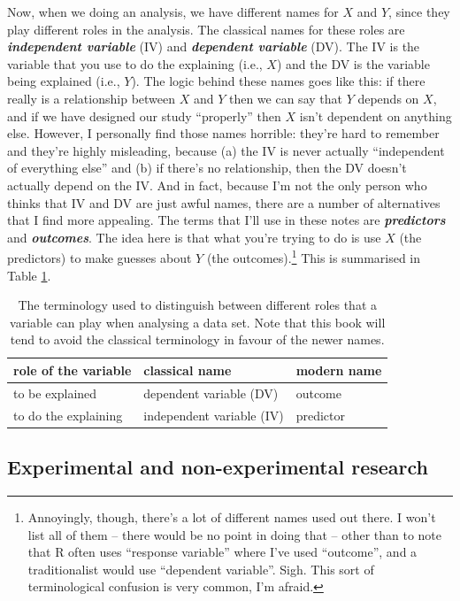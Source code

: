\documentclass[
]{book}
\begin{document}
Now, when we doing an analysis, we have different names for \(X\) and \(Y\), since they play different roles in the analysis. The classical names for these roles are \textbf{\emph{independent variable}} (IV) and \textbf{\emph{dependent variable}} (DV). The IV is the variable that you use to do the explaining (i.e., \(X\)) and the DV is the variable being explained (i.e., \(Y\)). The logic behind these names goes like this: if there really is a relationship between \(X\) and \(Y\) then we can say that \(Y\) depends on \(X\), and if we have designed our study ``properly'' then \(X\) isn't dependent on anything else. However, I personally find those names horrible: they're hard to remember and they're highly misleading, because (a) the IV is never actually ``independent of everything else'' and (b) if there's no relationship, then the DV doesn't actually depend on the IV. And in fact, because I'm not the only person who thinks that IV and DV are just awful names, there are a number of alternatives that I find more appealing. The terms that I'll use in these notes are \textbf{\emph{predictors}} and \textbf{\emph{outcomes}}. The idea here is that what you're trying to do is use \(X\) (the predictors) to make guesses about \(Y\) (the outcomes).\footnote{Annoyingly, though, there's a lot of different names used out there. I won't list all of them -- there would be no point in doing that -- other than to note that R often uses ``response variable'' where I've used ``outcome'', and a traditionalist would use ``dependent variable''. Sigh. This sort of terminological confusion is very common, I'm afraid.} This is summarised in Table \ref{tab:ivdv}.

\begin{table}

\caption{\label{tab:ivdv}The terminology used to distinguish between different roles that a variable can play when analysing a data set. Note that this book will tend to avoid the classical terminology in favour of the newer names.}
\centering
\begin{tabular}[t]{lll}
\toprule
role of the variable & classical name & modern name\\
\midrule
to be explained & dependent variable (DV) & outcome\\
to do the explaining & independent variable (IV) & predictor\\
\bottomrule
\end{tabular}
\end{table}

\hypertarget{researchdesigns}{%
\subsection{Experimental and non-experimental research}\label{researchdesigns}}
\end{document}
